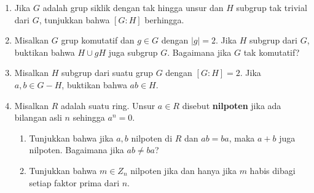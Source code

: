 \documentclass[11pt,a4paper]{article}
\begin{document}
\begin{enumerate}[label=\arabic*., start=37]
  \item %
        Jika $G$ adalah grup siklik dengan tak hingga unsur dan $H$ subgrup tak trivial dari $G$, tunjukkan bahwa $[G : H]$ berhingga.

  \item %
        Misalkan $G$ grup komutatif dan $g \in G$ dengan $|g| = 2$. Jika $H$ subgrup dari $G$, buktikan bahwa $H \cup gH$ juga subgrup $G$. Bagaimana jika $G$ tak komutatif?

  \item %
        Misalkan $H$ subgrup dari suatu grup $G$ dengan $[G : H] = 2$. Jika $a,b \in G - H$, buktikan bahwa $ab \in H$.

  \item %
        Misalkan $R$ adalah suatu ring. Unsur $a \in R$ disebut \textbf{nilpoten} jika ada bilangan asli $n$ sehingga $a^n = 0$.
        \begin{enumerate}[label=(\alph*)]
          \item Tunjukkan bahwa jika $a, b$ nilpoten di $R$ dan $ab = ba$, maka $a+b$ juga nilpoten. Bagaimana jika $ab \neq ba$?
          \item Tunjukkan bahwa $m \in Z_n$ nilpoten jika dan hanya jika $m$ habis dibagi setiap faktor prima dari $n$.
        \end{enumerate}
\end{enumerate}
\end{document}
